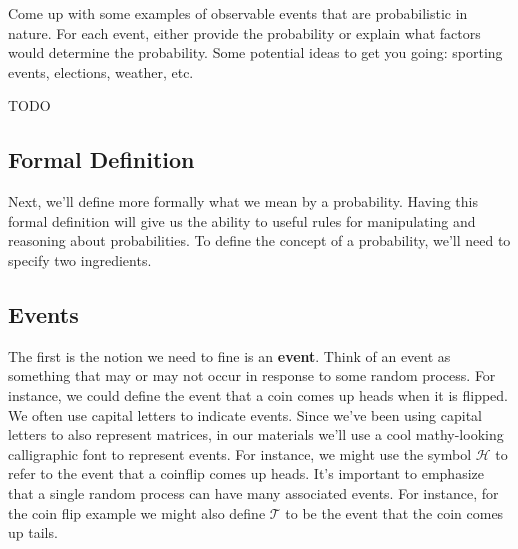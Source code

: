\documentclass[assignment01_Solutions]{subfiles}
\begin{document}
\vspace{1em}
\begin{exercise}
Come up with some examples of observable events that are probabilistic in nature.  For each event, either provide the probability or explain what factors would determine the probability.  Some potential ideas to get you going: sporting events, elections, weather, etc.

\begin{boxedsolution}
TODO
\end{boxedsolution}

\end{exercise}

\subsection{Formal Definition}

Next, we'll define more formally what we mean by a probability.  Having this formal definition will give us the ability to useful rules for manipulating and reasoning about probabilities.  To define the concept of a probability, we'll need to specify two ingredients.
\subsection{Events}

The first is the notion we need to fine is an \textbf{event}.  Think of an event as something that may or may not occur in response to some random process.  For instance, we could define the event that a coin comes up heads when it is flipped.  We often use capital letters to indicate events.  Since we've been using capital letters to also represent matrices, in our materials we'll use a cool mathy-looking calligraphic font to represent events.  For instance, we might use the symbol $\mathcal{H}$ to refer to the event that a coinflip comes up heads. It's important to emphasize that a single random process can have many associated events.   For instance, for the coin flip example we might also define $\mathcal{T}$ to be the event that the coin comes up tails.
\end{document}
